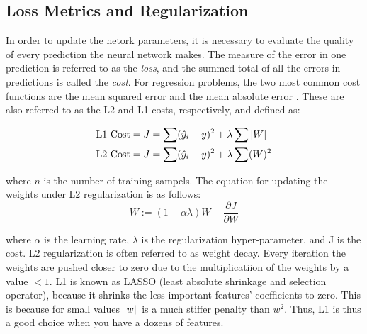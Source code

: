 \subsection{Loss Metrics and Regularization}
In order to update the netork parameters, it is necessary to evaluate the quality of every prediction the neural network makes. The measure of the error in one prediction is referred to as the \textit{loss}, and the summed total of all the errors in predictions is called the \textit{cost}. For regression problems, the two most common cost functions are the mean squared error and the mean absolute error \cite{regularization-2017survey}. These are also referred to as the L2 and L1 costs, respectively, and defined as:

\begin{align}
    \label{eqn:lossFunctions}
    \text{L1 Cost} &= J = \sum (\hat{y}_i - y)^2 + \lambda \sum \abs*{W} \\
    \text{L2 Cost} &= J = \sum (\hat{y}_i - y)^2 + \lambda \sum (W)^2
\end{align}

\noindent where $ n $ is the number of training sampels. The equation for updating the weights under L2 regularization is as follows:
\begin{equation}
    W := (1-\alpha \lambda)W - \frac{\partial J}{\partial W}  
\end{equation}

\noindent where $\alpha$ is the learning rate, $\lambda$ is the regularization hyper-parameter, and J is the cost. L2 regularization is often referred to as weight decay. Every iteration the weights are pushed closer to zero due to the multiplicatiion of the weights by a value $<1$. L1 is known as LASSO (least absolute shrinkage and selection operator), because it shrinks the less important features' coefficients to zero. This is because for small values $\abs*{w}$ is a much stiffer penalty than $w^2$. Thus, L1 is thus a good choice when you have a dozens of features.



